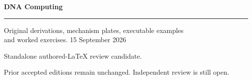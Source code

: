 \documentclass[11pt,oneside,openany]{book}
\begin{document}
\frontmatter
\begin{titlepage}
\color{Blue}\sffamily\vspace*{20mm}
{\Huge\bfseries DNA Computing\par}
\vspace{10mm}{\LARGE Chapter 5\par}
\vspace{8mm}{\Large DNA chemistry and sequence geometry\par}
\vspace{12mm}\rule{\linewidth}{.8pt}
\vspace{6mm}\par Original derivations, mechanism plates, executable examples\\and worked exercises.
\vfill 15 September 2026\par
Standalone authored-LaTeX review candidate.\par
Prior accepted editions remain unchanged. Independent review is still open.
\end{titlepage}
\tableofcontents
\mainmatter
\setcounter{chapter}{4}

\backmatter

\printindex
\end{document}
